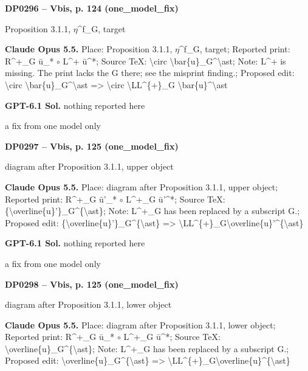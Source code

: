 \par\noindent\hypertarget{DP0296}{}\textbf{DP0296 -- Vbis, p. 124 (one\_model\_fix)}\par
Proposition 3.1.1, \ensuremath{\eta}\textasciicircum{}f\_G, target\par
\textbf{Claude Opus 5.5.} Place: Proposition 3.1.1, \ensuremath{\eta}\textasciicircum{}f\_G, target; Reported print: R\textasciicircum{}+\_G ū\_* \ensuremath{\circ} L\textasciicircum{}+ ū\textasciicircum{}*; Source TeX: \textbackslash{}circ  \textbackslash{}bar\{u\}\_G\textasciicircum{}\textbackslash{}ast; Note: L\textasciicircum{}+ is missing. The print lacks the G there; see the misprint finding.; Proposed edit: \textbackslash{}circ  \textbackslash{}bar\{u\}\_G\textasciicircum{}\textbackslash{}ast =\allowbreak > \textbackslash{}circ  \textbackslash{}LL\textasciicircum{}\{+\}\_G \textbackslash{}bar\{u\}\textasciicircum{}\textbackslash{}ast\par
\textbf{GPT-6.1 Sol.} nothing reported here\par
a fix from one model only\par
\par\noindent\hypertarget{DP0297}{}\textbf{DP0297 -- Vbis, p. 125 (one\_model\_fix)}\par
diagram after Proposition 3.1.1, upper object\par
\textbf{Claude Opus 5.5.} Place: diagram after Proposition 3.1.1, upper object; Reported print: R\textasciicircum{}+\_G ū'\_* \ensuremath{\circ} L\textasciicircum{}+\_G ū'\textasciicircum{}*; Source TeX: \{\textbackslash{}overline\{u\}'\}\_G\textasciicircum{}\{\textbackslash{}ast\}; Note: L\textasciicircum{}+\_G has been replaced by a subscript G.; Proposed edit: \{\textbackslash{}overline\{u\}'\}\_G\textasciicircum{}\{\textbackslash{}ast\} =\allowbreak > \textbackslash{}LL\textasciicircum{}\{+\}\_G\textbackslash{}overline\{u\}'\textasciicircum{}\{\textbackslash{}ast\}\par
\textbf{GPT-6.1 Sol.} nothing reported here\par
a fix from one model only\par
\par\noindent\hypertarget{DP0298}{}\textbf{DP0298 -- Vbis, p. 125 (one\_model\_fix)}\par
diagram after Proposition 3.1.1, lower object\par
\textbf{Claude Opus 5.5.} Place: diagram after Proposition 3.1.1, lower object; Reported print: R\textasciicircum{}+\_G ū\_* \ensuremath{\circ} L\textasciicircum{}+\_G ū\textasciicircum{}*; Source TeX: \textbackslash{}overline\{u\}\_G\textasciicircum{}\{\textbackslash{}ast\}; Note: L\textasciicircum{}+\_G has been replaced by a subscript G.; Proposed edit: \textbackslash{}overline\{u\}\_G\textasciicircum{}\{\textbackslash{}ast\} =\allowbreak > \textbackslash{}LL\textasciicircum{}\{+\}\_G\textbackslash{}overline\{u\}\textasciicircum{}\{\textbackslash{}ast\}\par
